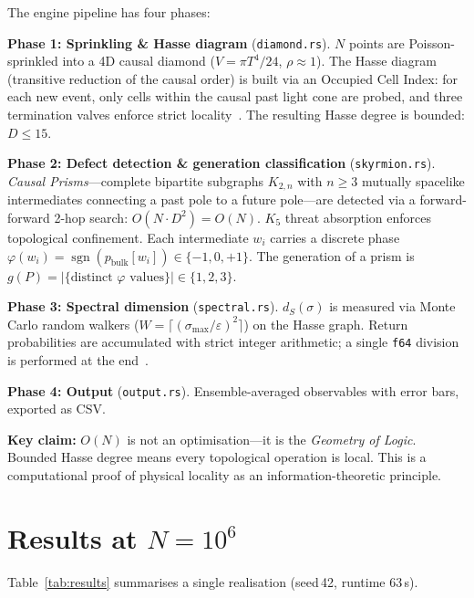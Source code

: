 \documentclass[11pt,a4paper]{article}
\begin{document}
The engine pipeline has four phases:

\textbf{Phase 1: Sprinkling \& Hasse diagram}
(\texttt{diamond.rs}).
$N$ points are Poisson-sprinkled into a 4D causal diamond
($V = \pi T^4/24$, $\rho \approx 1$).
The Hasse diagram (transitive reduction of the causal order) is built
via an Occupied Cell Index: for each new event, only cells within the
causal past light cone are probed, and three termination valves
enforce strict locality~\cite{bombelli1987,surya2019}.
The resulting Hasse degree is bounded: $D \leq 15$.

\textbf{Phase 2: Defect detection \& generation classification}
(\texttt{skyrmion.rs}).
\emph{Causal Prisms}---complete bipartite subgraphs $K_{2,n}$ with
$n \geq 3$ mutually spacelike intermediates connecting a past pole
to a future pole---are detected via a forward-forward 2-hop search:
$O(N \cdot D^2) = O(N)$.
$K_5$ threat absorption enforces topological confinement.
Each intermediate $w_i$ carries a discrete phase
$\varphi(w_i) = \operatorname{sgn}(p_{\text{bulk}}[w_i]) \in \{-1, 0, +1\}$.
The generation of a prism is
$g(P) = |\{\text{distinct } \varphi \text{ values}\}| \in \{1, 2, 3\}$.

\textbf{Phase 3: Spectral dimension}
(\texttt{spectral.rs}).
$d_S(\sigma)$ is measured via Monte Carlo random walkers
($W = \lceil (\sigma_{\max}/\varepsilon)^2 \rceil$) on the Hasse graph.
Return probabilities are accumulated with strict integer arithmetic;
a single \texttt{f64} division is performed at the end~\cite{eichhorn2014}.

\textbf{Phase 4: Output}
(\texttt{output.rs}).
Ensemble-averaged observables with error bars, exported as CSV.

\smallskip
\textbf{Key claim:} $O(N)$ is not an optimisation---it is the
\emph{Geometry of Logic}.
Bounded Hasse degree means every topological operation is local.
This is a computational proof of physical locality as an
information-theoretic principle.

\section{Results at $N = 10^6$}

Table~\ref{tab:results} summarises a single realisation (seed\,42,
runtime 63\,s).
\end{document}
